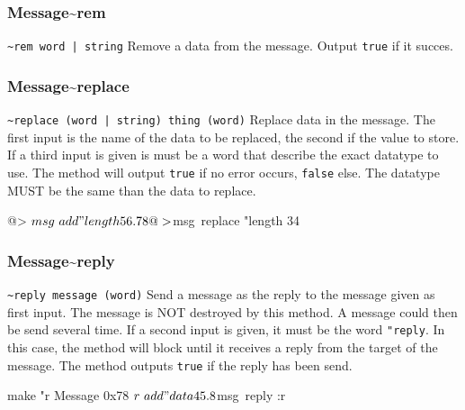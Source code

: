 \subsubsection*{Message\textasciitilde rem} 

{\tt \verb+~+rem word | string} 
\newline\newline
Remove a data from the message. Output {\tt true} if it succes.

\subsubsection*{Message\textasciitilde replace} 

{\tt \verb+~+replace (word | string) thing (word)} 
\newline\newline
Replace data in the message. The first input is the name of the data to be replaced, the second if the value to store. If a third input is given is must be a word that describe the exact datatype to use. The method will output {\tt true} if no error occurs, {\tt false} else. The datatype MUST be the same than the data to replace.  
\begin{verbatimtab}
@> $msg~add "length 56.78
@> $msg~replace "length 34
\end{verbatimtab}

\subsubsection*{Message\textasciitilde reply} 

{\tt \verb+~+reply message (word)} 
\newline\newline
Send a message as the reply to the message given as first input. The message is NOT destroyed by this method. A message could then be send several time. If a second input is given, it must be the word {\tt "reply}. In this case, the method will block until it receives a reply from the target of the message. The method outputs {\tt true} if the reply has been send.
\begin{verbatimtab}
make "r Message 0x78
$r~add "data 45.8
$msg~reply :r 
\end{verbatimtab} 
 
